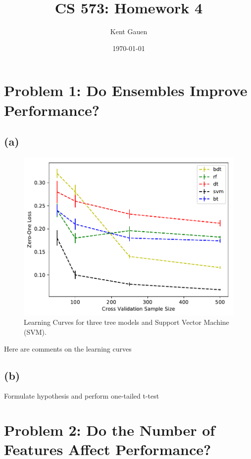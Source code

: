 \documentclass[11pt]{article}
\title{CS 573: Homework 4}
\author{Kent Gauen}
\date{\today}
\begin{document}
\maketitle


\section*{Problem 1: Do Ensembles Improve Performance?}

\subsection*{(a)}

\begin{minipage}{0.5\textwidth}
\begin{figure}[H]
  \centering
  \includegraphics[width=\linewidth]{experiment_1}
  \caption{Learning Curves for three tree models and Support Vector Machine (SVM).}
\end{figure}
\end{minipage}%
\hspace{5mm}
\begin{minipage}{0.5\textwidth}
  Here are comments on the learning curves
\end{minipage}

\subsection*{(b)}

Formulate hypothesis and perform one-tailed t-test

\section*{Problem 2: Do the Number of Features Affect Performance?}
\end{document}
